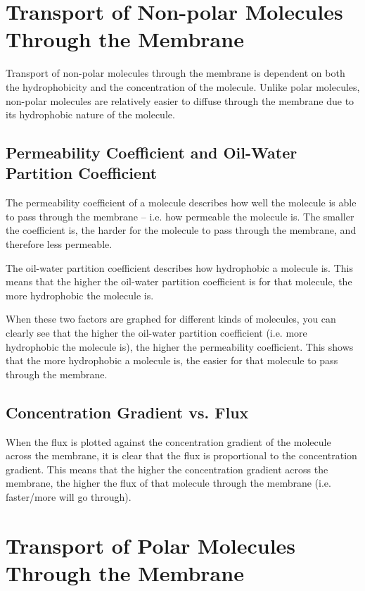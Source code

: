 \section{Transport of Non-polar Molecules Through the Membrane}

Transport of non-polar molecules through the membrane is dependent on both the hydrophobicity and the concentration of the molecule.
Unlike polar molecules, non-polar molecules are relatively easier to diffuse through the membrane due to its hydrophobic nature of the molecule.

\subsection{Permeability Coefficient and Oil-Water Partition Coefficient}

The permeability coefficient of a molecule describes how well the molecule is able to pass through the membrane -- i.e. how permeable the molecule is.
The smaller the coefficient is, the harder for the molecule to pass through the membrane, and therefore less permeable.

The oil-water partition coefficient describes how hydrophobic a molecule is.
This means that the higher the oil-water partition coefficient is for that molecule, the more hydrophobic the molecule is.

When these two factors are graphed for different kinds of molecules, you can clearly see that the higher the oil-water partition coefficient (i.e. more hydrophobic the molecule is), the higher the permeability coefficient.
This shows that the more hydrophobic a molecule is, the easier for that molecule to pass through the membrane.

\subsection{Concentration Gradient vs. Flux}

When the  flux  is plotted against the concentration gradient of the molecule across the membrane, it is clear that the flux is proportional to the concentration gradient.
This means that the higher the concentration gradient across the membrane, the higher the flux of that molecule through the membrane (i.e. faster/more will go through).

\section{Transport of Polar Molecules Through the Membrane}

